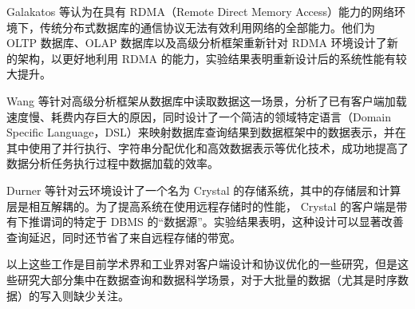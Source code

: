Galakatos 等认为在具有 RDMA（Remote Direct Memory Access）\cite{recio2007remote}能力的网络环境下，传统分布式数据库的通信协议无法有效利用网络的全部能力。他们为 OLTP 数据库、OLAP 数据库以及高级分析框架重新针对 RDMA 环境设计了新的架构，以更好地利用 RDMA 的能力，实验结果表明重新设计后的系统性能有较大提升\cite{galakatos2016end}。

Wang 等针对高级分析框架从数据库中读取数据这一场景，分析了已有客户端加载速度慢、耗费内存巨大的原因，同时设计了一个简洁的领域特定语言（Domain Specific Language，DSL）来映射数据库查询结果到数据框架中的数据表示，并在其中使用了并行执行、字符串分配优化和高效数据表示等优化技术，成功地提高了数据分析任务执行过程中数据加载的效率\cite{wang2022connectorx}。

Durner 等针对云环境设计了一个名为 Crystal 的存储系统，其中的存储层和计算层是相互解耦的。为了提高系统在使用远程存储时的性能， Crystal 的客户端是带有下推谓词的特定于 DBMS 的“数据源”。实验结果表明，这种设计可以显著改善查询延迟，同时还节省了来自远程存储的带宽\cite{durner2021crystal}。

以上这些工作是目前学术界和工业界对客户端设计和协议优化的一些研究，但是这些研究大部分集中在数据查询和数据科学场景，对于大批量的数据（尤其是时序数据）的写入则缺少关注。